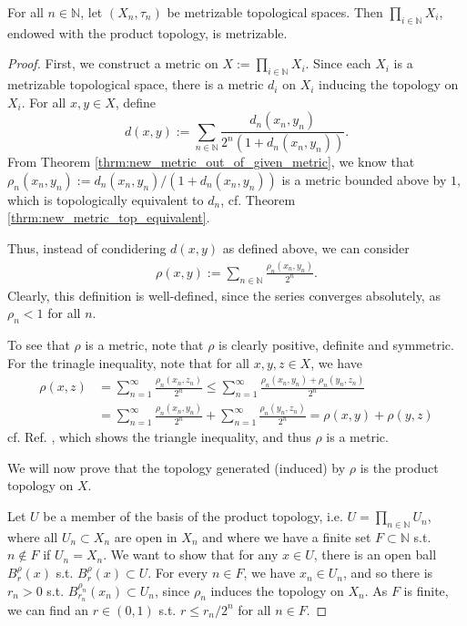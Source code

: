 \begin{theorem}
	For all $n\in\mathbb N$, let $(X_n, \tau_n)$ be metrizable topological spaces. Then $\prod_{i\in\mathbb N}X_i$, endowed with the product topology, is metrizable.
\end{theorem}

\begin{proof}\cite{361778, 362319}
	First, we construct a metric on $X := \prod_{i\in\mathbb N}X_i$. Since each $X_i$ is a metrizable topological space, there is a metric $d_i$ on $X_i$ inducing the topology on $X_i$. For all $x, y\in X$, define
	$$d(x, y) := \sum_{n\in\mathbb N}\frac{d_n(x_n, y_n)}{2^n\left(1 + d_n(x_n, y_n)\right)}.$$
	From Theorem \ref{thrm:new_metric_out_of_given_metric}, we know that $\rho_n(x_n, y_n) := d_n(x_n, y_n) / (1 + d_n(x_n, y_n))$ is a metric bounded above by $1$, which is topologically equivalent to $d_n$, cf. Theorem \ref{thrm:new_metric_top_equivalent}. 
	
	Thus, instead of condidering $d(x, y)$ as defined above, we can consider 
	\begin{align}\label{eq:metric_inducing_tychonoff_top_on_countable_prod}
		\rho(x, y) := \sum_{n\in\mathbb N}\frac{\rho_n(x_n, y_n)}{2^n}.
	\end{align}
	Clearly, this definition is well-defined, since the series converges absolutely, as $\rho_n < 1$ for all $n$.
	
	To see that $\rho$ is a metric, note that $\rho$ is clearly positive, definite and symmetric. For the trinagle inequality, note that for all $x, y, z\in X$, we have
	\begin{align*}
		\rho(x, z) &= \sum_{n=1}^{\infty}\frac{\rho_n(x_n, z_n)}{2^n} \leq \sum_{n=1}^{\infty}\frac{\rho_n(x_n, y_n) + \rho_n(y_n, z_n)}{2^n} 
		\\ &= \sum_{n=1}^{\infty}\frac{\rho_n(x_n, y_n)}{2^n} + \sum_{n=1}^{\infty}\frac{\rho_n(y_n, z_n)}{2^n} = \rho(x, y) + \rho(y, z)
	\end{align*}
	cf. Ref. \cite{2163556}, which shows the triangle inequality, and thus $\rho$ is a metric.
	
	We will now prove that the topology generated (induced) by $\rho$ is the product topology on $X$. 
	
	Let $U$ be a member of the basis of the product topology, i.e. $U = \prod_{n\in\mathbb N}U_n$, where all $U_n\subset X_n$ are open in $X_n$ and where we have a finite set $F\subset\mathbb N$ s.t. $n\notin F$ if $U_n = X_n$. We want to show that for any $x\in U$, there is an open ball $B^{\rho}_{r}(x)$ s.t. $B_r^{\rho}(x)\subset U$. For every $n\in F$, we have $x_n\in U_n$, and so there is $r_n > 0$ s.t. $B^{\rho_n}_{r_n}(x_n) \subset U_n$, since $\rho_n$ induces the topology on $X_n$. As $F$ is finite, we can find an $r\in (0, 1)$ s.t. $r \leq r_n/2^n$ for all $n\in F$.
	

\end{proof}
